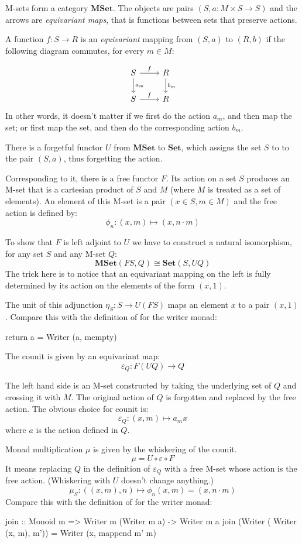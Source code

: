 \documentclass[DaoFP]{subfiles}
\begin{document}
M-sets form a category $\mathbf{MSet}$. The objects are pairs $(S, a\colon M\times S \to S)$ and the arrows are  \emph{equivariant maps}, that is  functions between sets that preserve actions. 

A function $f \colon S \to R$ is an \emph{equivariant} mapping from $(S, a)$ to $(R, b)$ if the following diagram commutes, for every $m \in M$:

\[
 \begin{tikzcd}
 S 
 \arrow[r, "f"]
 \arrow[d, "a_m"]
 & R
\arrow[d, "b_m"]
 \\
S
 \arrow[r, "f"]
 & R
  \end{tikzcd}
\]
In other words, it doesn't matter if we first do the action $a_m$, and then map the set; or first map the set, and then do the corresponding action $b_m$.

There is a forgetful functor $U$ from $\mathbf{MSet}$ to $\mathbf{Set}$, which assigns the set $S$ to to the pair $(S, a)$, thus forgetting the action.  

Corresponding to it, there is a free functor $F$. Its action on a set $S$ produces an M-set that is a cartesian product of $S$ and $M$ (where $M$ is treated as a set of elements). An element of this M-set is a pair $(x \in S, m \in M)$ and the free action is defined by:
\[ \phi_n \colon (x, m) \mapsto (x, n \cdot m) \]

To show that $F$ is left adjoint to $U$ we have to construct a natural isomorphism, for any set $S$ and any M-set $Q$:
\[ \mathbf{MSet}( F S, Q) \cong \mathbf{Set}(S, U Q) \]
The trick here is to notice that an equivariant mapping on the left is fully determined by its action on the elements of the form $(x, 1)$.

The unit of this adjunction $\eta_S \colon S \to U (F S)$ maps an element $x$ to a pair $(x, 1)$. Compare this with the definition of  for the writer monad:
\begin{haskell}
return a = Writer (a, mempty)
\end{haskell}

The counit is given by an equivariant map:
\[ \varepsilon_Q \colon F (U Q) \to Q \]

The left hand side is an M-set constructed by taking the underlying set of $Q$ and crossing it with $M$. The original action of $Q$ is forgotten and replaced by the free action. The obvious choice for counit is:
\[ \varepsilon_Q \colon (x, m) \mapsto a_m x \]
where $a$ is the action defined in $Q$.

Monad multiplication $\mu$ is given by the whiskering of the counit.
\[ \mu = U \circ \varepsilon \circ F \]
It means replacing $Q$ in the definition of $\varepsilon_Q$ with a free M-set whose action is the free action. (Whiskering with $U$ doesn't change anything.)
\[ \mu_S \colon ((x, m), n) \mapsto \phi_n (x, m) = (x, n \cdot m) \]
Compare this with the definition of  for the writer monad:
\begin{haskell}
join :: Monoid m => Writer m (Writer m a) -> Writer m a
join (Writer ( Writer (x, m), m')) = Writer (x, mappend m' m)
\end{haskell}
\end{document}
